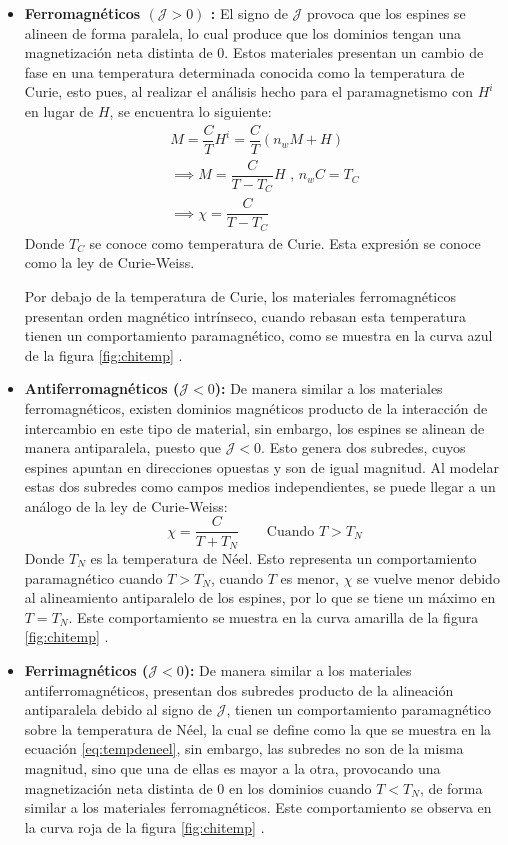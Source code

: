 \documentclass[../main.tex]{subfiles}
\begin{document}
\begin{itemize}
    \item \textbf{Ferromagnéticos $(\mathcal{J}>0)$ :} El signo de $\mathcal{J}$ provoca que los espines se alineen de forma paralela, lo cual produce que los dominios tengan una magnetización neta distinta de 0. Estos materiales presentan un cambio de fase en una temperatura determinada conocida como la temperatura de Curie, esto pues, al realizar el análisis hecho para el paramagnetismo con $H^i$ en lugar de $H$, se encuentra lo siguiente:
    \begin{equation}\begin{split}
        M=\dfrac{C}{T}H^i=\dfrac{C}{T}(n_wM+H)\\
        \implies M=\dfrac{C}{T-T_C}H\text{ , }n_wC=T_C\\
        \implies \chi=\dfrac{C}{T-T_C}
    \end{split}
        \label{eq:leycurieweiss}
    \end{equation}
    Donde $T_C$ se conoce como temperatura de Curie. Esta expresión se conoce como la ley de Curie-Weiss.

    Por debajo de la temperatura de Curie, los materiales ferromagnéticos presentan orden magnético intrínseco, cuando rebasan esta temperatura tienen un comportamiento paramagnético, como se muestra en la curva azul de la figura \ref{fig:chitemp} \cite{coey2010magnetism}.
    \item \textbf{Antiferromagnéticos ($\mathcal{J}<0$):} De manera similar a los materiales ferromagnéticos, existen dominios magnéticos producto de la interacción de intercambio en este tipo de material, sin embargo, los espines se alinean de manera antiparalela, puesto que $\mathcal{J}<0$. Esto genera dos subredes, cuyos espines apuntan en direcciones opuestas y son de igual magnitud. Al modelar estas dos subredes como campos medios independientes, se puede llegar a un análogo de la ley de Curie-Weiss:
    \begin{equation}
        \chi=\dfrac{C}{T+T_N}\qquad\text{Cuando }T>T_N
        \label{eq:tempdeneel}
    \end{equation}
    Donde $T_N$ es la temperatura de Néel. Esto representa un comportamiento paramagnético cuando $T>T_N$, cuando $T$ es menor, $\chi$ se vuelve menor debido al alineamiento antiparalelo de los espines, por lo que se tiene un máximo en $T=T_N$. Este comportamiento se muestra en la curva amarilla de la figura \ref{fig:chitemp} \cite{coey2010magnetism}.
    \item \textbf{Ferrimagnéticos ($\mathcal{J}<0$):} De manera similar a los materiales antiferromagnéticos, presentan dos subredes producto de la alineación antiparalela debido al signo de $\mathcal{J}$, tienen un comportamiento paramagnético sobre la temperatura de Néel, la cual se define como la que se muestra en la ecuación \ref{eq:tempdeneel}, sin embargo, las subredes no son de la misma magnitud, sino que una de ellas es mayor a la otra, provocando una magnetización neta distinta de 0 en los dominios cuando $T<T_N$, de forma similar a los materiales ferromagnéticos. Este comportamiento se observa en la curva roja de la figura \ref{fig:chitemp} \cite{coey2010magnetism}.
\end{itemize}
\end{document}
